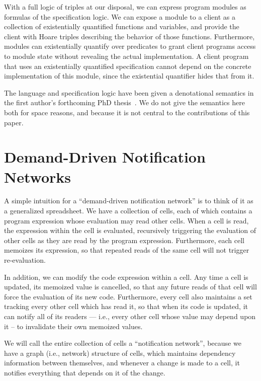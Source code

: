 \documentclass[preprint,natbib]{sigplanconf}
\begin{document}
With a full logic of triples at our disposal, we can express program
modules as formulas of the specification logic. We can expose a module
to a client as a collection of existentially quantified functions and
variables, and provide the client with Hoare triples describing the
behavior of those functions. Furthermore, modules can existentially
quantify over predicates to grant client programs access to module
state without revealing the actual implementation. A client program
that uses an existentially quantified specification cannot depend on
the concrete implementation of this module, since the existential
quantifier hides that from it.

The language and specification logic have been given a denotational
semantics in the first author's forthcoming PhD
thesis~\cite{tech-report}. We do not give the semantics here both for
space reasons, and because it is not central to the contributions of
this paper. 

\section{Demand-Driven Notification Networks}

A simple intuition for a ``demand-driven notification network'' is to
think of it as a generalized spreadsheet. We have a collection of
cells, each of which contains a program expression whose evaluation may
read other cells. When a cell is read, the expression within the
cell is evaluated, recursively triggering the evaluation of other
cells as they are read by the program expression. Furthermore, each
cell memoizes its expression, so that repeated reads of the same cell
will not trigger re-evaluation.

In addition, we can modify the code expression within a cell.  Any
time a cell is updated, its memoized value is cancelled, so that any
future reads of that cell will force the evaluation of its new
code. Furthermore, every cell also maintains a set tracking every
other cell which has read it, so that when its code is updated, it can
notify all of its readers --- i.e., every other cell whose value may
depend upon it -- to invalidate their own memoized values. 

We will call the entire collection of cells a ``notification
network'', because we have a graph (i.e., network) structure of cells,
which maintains dependency information between themselves, and
whenever a change is made to a cell, it notifies everything that
depends on it of the change.
\end{document}
